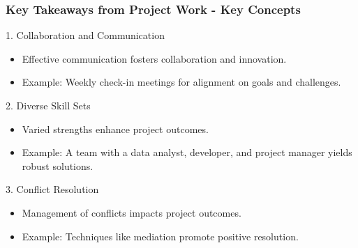 \documentclass[aspectratio=169]{beamer}
\begin{document}
\begin{frame}[fragile]
    \frametitle{Key Takeaways from Project Work - Key Concepts}
    \begin{block}{1. Collaboration and Communication}
        \begin{itemize}
            \item Effective communication fosters collaboration and innovation.
            \item Example: Weekly check-in meetings for alignment on goals and challenges.
        \end{itemize}
    \end{block}
    
    \begin{block}{2. Diverse Skill Sets}
        \begin{itemize}
            \item Varied strengths enhance project outcomes.
            \item Example: A team with a data analyst, developer, and project manager yields robust solutions.
        \end{itemize}
    \end{block}
    
    \begin{block}{3. Conflict Resolution}
        \begin{itemize}
            \item Management of conflicts impacts project outcomes.
            \item Example: Techniques like mediation promote positive resolution.
        \end{itemize}
    \end{block}
\end{frame}
\end{document}
